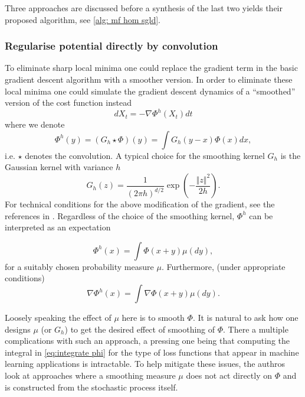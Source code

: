 \documentclass{article}
\begin{document}
Three approaches are discussed before a synthesis of the last two yields their proposed algorithm, see \ref{alg: mf hom sgld}.



\subsubsection{Regularise potential directly by convolution}\label{sec:direct smoothing}

To eliminate sharp local minima one could replace the gradient term
in the basic gradient descent algorithm with a smoother version. In order to
eliminate these local minima one could simulate the gradient descent
dynamics of a ``smoothed'' version of the cost function instead
\begin{equation}
dX_{t}=-\nabla\Phi^{h}(X_{t})dt\label{eq:ode_h}
\end{equation}
where we denote 
\begin{equation}
\Phi^{h}\left(y\right)=(G_{h}\star\Phi)(y)=\int G_{h}(y-x)\Phi(x)dx,\label{eq:integrate phi}
\end{equation}
i.e. $\star$ denotes the convolution. A typical choice for the smoothing
kernel $G_{h}$ is the Gaussian kernel with variance $h$ 
\[
G_{h}(z)=\frac{1}{\left(2\pi h\right)^{d/2}}\exp\left(-\frac{\left\Vert z\right\Vert ^{2}}{2h}\right).
\]
For technical conditions for the above modification of the gradient, see the references in \cite{kantas2019sharpflatshallowweakly}. Regardless
of the choice of the smoothing kernel, $\Phi^{h}$ can be interpreted
as an expectation 

\[
\Phi^{h}\left(x\right)=\int\Phi(x+y)\mu(dy),
\]
for a suitably chosen probability measure $\mu$. Furthermore, (under
appropriate conditions) 
\begin{equation}
\nabla\Phi^{h}\left(x\right)=\int\nabla\Phi(x+y)\mu(dy).\label{eq:smooth_grad}
\end{equation}

Loosely speaking the effect of $\mu$ here is to smooth $\Phi$.
It is natural to ask how one designs $\mu$ (or $G_{h}$)
to get the desired effect of smoothing of $\Phi$. There a multiple complications with such an approach, a pressing one being that computing the integral in \ref{eq:integrate phi}
for the type of loss functions that appear in machine learning applications
is intractable. To help mitigate these issues, the authros look at approaches where a smoothing measure $\mu$ does not act directly on $\Phi$ and is constructed from the stochastic process itself.
\end{document}
